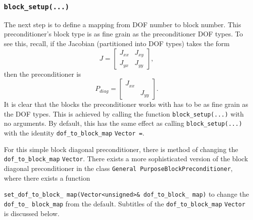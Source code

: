 \subsubsection{\texttt{block\_setup(...)}\label{sec:block_setup}}
The next step is to define a mapping from DOF number to block number. This
preconditioner's block type is as fine grain as the preconditioner DOF types.
To see this, recall, if the Jacobian (partitioned into DOF types) takes the
form 
\begin{equation*}
J =
\begin{bmatrix}
J_{xx}&J_{xy} \\
J_{yx}&J_{yy}
\end{bmatrix},
\end{equation*}
then the preconditioner is
\begin{equation*}
P_{diag} =
\begin{bmatrix}
J_{xx}& \\
      &J_{yy}
\end{bmatrix}.
\end{equation*}
It is clear that the blocks the preconditioner works with has to be as fine
grain as the DOF types. This is achieved by calling the function
\texttt{block\_\allowbreak setup(...)} with no arguments. By default, this has
the same effect as calling \texttt{block\_\allowbreak setup(...)} with the
identity \texttt{dof\_\allowbreak to\_\allowbreak block\_\allowbreak map}
\texttt{Vector \allowbreak =\allowbreak [0 1]}.


For this simple block diagonal preconditioner, there is method of changing the
\texttt{dof\_\allowbreak to\_\allowbreak block\_\allowbreak map}
\texttt{Vector}. There exists a more sophisticated version of the block
diagonal preconditioner in the class \texttt{General\allowbreak
  Purpose\allowbreak Block\allowbreak Preconditioner}, where there exists a
function

\texttt{set\_\allowbreak dof\_\allowbreak to\_\allowbreak block\_\allowbreak
  map(Vector<unsigned>\& dof\_\allowbreak to\_\allowbreak block\_\allowbreak
  map)} to change the \texttt{dof\_\allowbreak to\_\allowbreak
  block\_\allowbreak map} from the default. Subtitles of the
\texttt{dof\_\allowbreak to\_\allowbreak block\_\allowbreak map}
\texttt{Vector} is discussed below.

